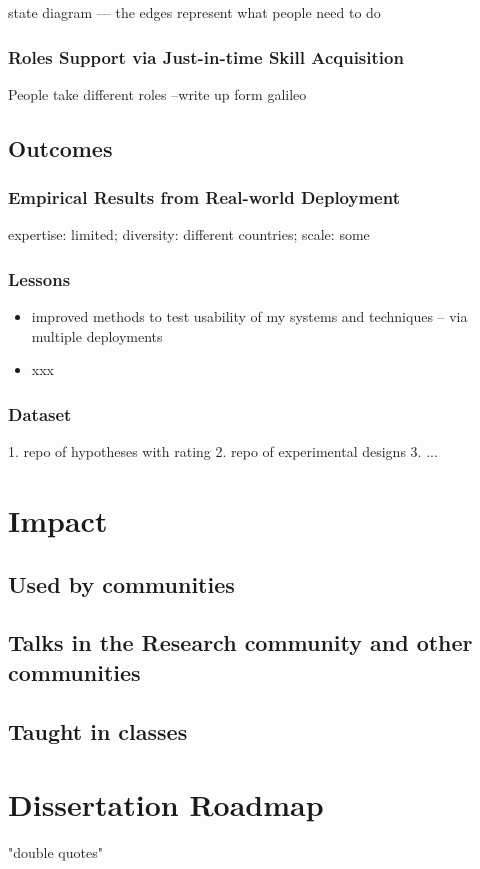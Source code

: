 state diagram — the edges represent what people need to do 

\subsubsection{Roles Support via Just-in-time Skill Acquisition}
 People take different roles
--write up form galileo


\subsection{Outcomes}
\subsubsection{Empirical Results from Real-world Deployment}
expertise: limited; diversity: different countries; scale: some

\subsubsection{Lessons}
\begin{itemize}
\item improved methods to test usability of my systems and techniques -- via multiple deployments
\item xxx
\end{itemize}

\subsubsection{Dataset}
1. repo of hypotheses with rating
2. repo of experimental designs
3. ...

\section{Impact}
 \subsection{Used by communities}
 \subsection{Talks in the Research community and other communities}
 \subsection{Taught in classes}


\section{Dissertation Roadmap}



"double quotes"

